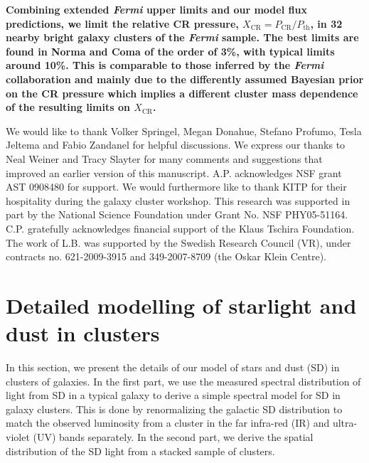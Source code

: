 \documentclass[10pt,aps,pra,reprint,amsmath,amsfonts,amssymb,showpacs,nofootinbib,floatfix]{revtex4-1}
\def\C#1{{\bf #1}}
\newcommand{\Fermi}{{\em Fermi}\xspace}
\newcommand{\rmn}{\mathrm}
\newcommand{\CR}{\rmn{CR}}
\begin{document}
{\C{Combining extended \Fermi upper limits and our model flux
  predictions, we limit the relative CR pressure, $X_\CR =
  P_\CR/P_\rmn{th}$, in 32 nearby bright galaxy clusters of the \Fermi
  sample. The best limits are found in Norma and Coma of the order of
  3\%, with typical limits around 10\%. This is comparable to those
  inferred by the \Fermi collaboration \cite{2010ApJ...717L..71A} and
  mainly due to the differently assumed Bayesian prior on the CR
  pressure which implies a different cluster mass dependence of the
  resulting limits on $X_\CR$.}




\smallskip We would like to thank Volker Springel, Megan Donahue,
Stefano Profumo, Tesla Jeltema and Fabio Zandanel for helpful
discussions. We express our thanks to Neal Weiner and Tracy Slayter
for many comments and suggestions that improved an earlier version of
this manuscript. A.P. acknowledges NSF grant AST 0908480 for
support. We would furthermore like to thank KITP for their hospitality
during the galaxy cluster workshop. This research was supported in
part by the National Science Foundation under Grant No. NSF
PHY05-51164. C.P. gratefully acknowledges financial support of the
Klaus Tschira Foundation. The work of L.B. was supported by the
Swedish Research Council (VR), under contracts no. 621-2009-3915 and
349-2007-8709 (the Oskar Klein Centre).


\vspace{-0.7cm}

%
%

\appendix

\section{Detailed modelling of starlight and dust in clusters}
\label{sect:SD}
In this section, we present the details of our model of stars and dust
(SD) in clusters of galaxies. In the first part, we use the measured
spectral distribution of light from SD in a typical galaxy to derive a
simple spectral model for SD in galaxy clusters. This is done by
renormalizing the galactic SD distribution to match the observed luminosity
from a cluster in the far infra-red (IR) and ultra-violet (UV) bands
separately. In the second part, we derive the spatial distribution of
the SD light from a stacked sample of clusters.

}
\end{document}
